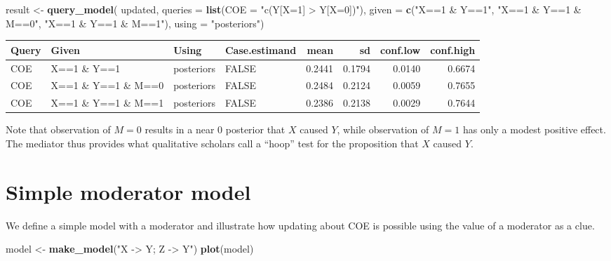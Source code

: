 \documentclass[
  12pt,
]{book}
\newenvironment{Shaded}{\begin{snugshade}}{\end{snugshade}}
\newcommand{\AttributeTok}[1]{\textcolor[rgb]{0.13,0.29,0.53}{#1}}
\newcommand{\FunctionTok}[1]{\textcolor[rgb]{0.13,0.29,0.53}{\textbf{#1}}}
\newcommand{\NormalTok}[1]{#1}
\newcommand{\OtherTok}[1]{\textcolor[rgb]{0.56,0.35,0.01}{#1}}
\newcommand{\StringTok}[1]{\textcolor[rgb]{0.31,0.60,0.02}{#1}}
\begin{document}
\begin{Shaded}
\begin{Highlighting}[]
\NormalTok{result }\OtherTok{\textless{}{-}} \FunctionTok{query\_model}\NormalTok{(}
\NormalTok{    updated, }
    \AttributeTok{queries =} \FunctionTok{list}\NormalTok{(}\AttributeTok{COE =} \StringTok{"c(Y[X=1] \textgreater{} Y[X=0])"}\NormalTok{), }
    \AttributeTok{given =} \FunctionTok{c}\NormalTok{(}\StringTok{"X==1 \& Y==1"}\NormalTok{, }\StringTok{"X==1 \& Y==1 \& M==0"}\NormalTok{, }\StringTok{"X==1 \& Y==1 \& M==1"}\NormalTok{),}
    \AttributeTok{using =} \StringTok{"posteriors"}\NormalTok{)}
\end{Highlighting}
\end{Shaded}

\begin{tabular}{l|l|l|l|r|r|r|r}
\hline
Query & Given & Using & Case.estimand & mean & sd & conf.low & conf.high\\
\hline
COE & X==1 \& Y==1 & posteriors & FALSE & 0.2441 & 0.1794 & 0.0140 & 0.6674\\
\hline
COE & X==1 \& Y==1 \& M==0 & posteriors & FALSE & 0.2484 & 0.2124 & 0.0059 & 0.7655\\
\hline
COE & X==1 \& Y==1 \& M==1 & posteriors & FALSE & 0.2386 & 0.2138 & 0.0029 & 0.7644\\
\hline
\end{tabular}

Note that observation of \(M=0\) results in a near 0 posterior that \(X\) caused \(Y\), while observation of \(M=1\) has only a modest positive effect. The mediator thus provides what qualitative scholars call a ``hoop'' test for the proposition that \(X\) caused \(Y\).

\hypertarget{simple-moderator-model}{%
\section{Simple moderator model}\label{simple-moderator-model}}

We define a simple model with a moderator and illustrate how updating about COE is possible using the value of a moderator as a clue.

\begin{Shaded}
\begin{Highlighting}[]
\NormalTok{model }\OtherTok{\textless{}{-}} \FunctionTok{make\_model}\NormalTok{(}\StringTok{"X {-}\textgreater{} Y; Z {-}\textgreater{} Y"}\NormalTok{) }
\FunctionTok{plot}\NormalTok{(model)}
\end{Highlighting}
\end{Shaded}
\end{document}
